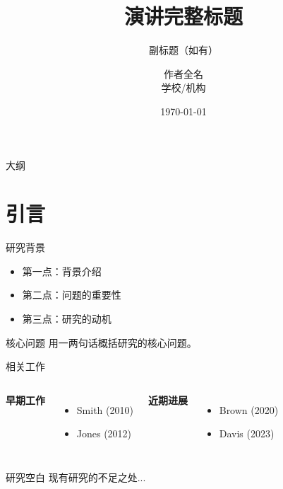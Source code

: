 \documentclass[aspectratio=169,11pt]{beamer}
\title[短标题]{演讲完整标题}
\subtitle{副标题（如有）}
\author[作者缩写]{作者全名 \\ \small 学校/机构}
\institute{学校或会议名称}
\date{\today}
\begin{document}
\begin{frame}
    \titlepage
\end{frame}

\begin{frame}{大纲}
    \tableofcontents
\end{frame}

\section{引言}

\begin{frame}{研究背景}
    \begin{itemize}
        \item 第一点：背景介绍
        \item 第二点：问题的重要性
        \item 第三点：研究的动机
    \end{itemize}

    \vspace{1em}
    \begin{block}{核心问题}
        用一两句话概括研究的核心问题。
    \end{block}
\end{frame}

\begin{frame}{相关工作}
    \begin{columns}
        \textbf{早期工作}
        \begin{itemize}
            \item Smith (2010)
            \item Jones (2012)
        \end{itemize}

        \textbf{近期进展}
        \begin{itemize}
            \item Brown (2020)
            \item Davis (2023)
        \end{itemize}
    \end{columns}

    \vspace{1em}
    \begin{alertblock}{研究空白}
        现有研究的不足之处...
    \end{alertblock}
\end{frame}
\end{document}
